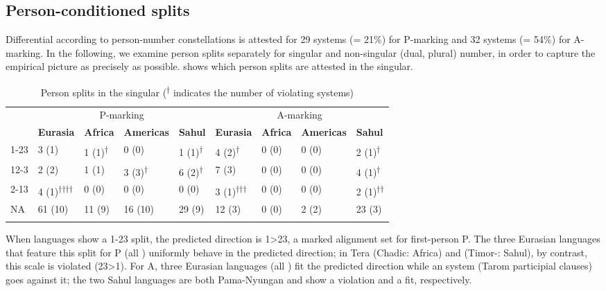 \documentclass[output=paper]{langscibook}
\begin{document}
\subsection{Person-conditioned splits}
\label{18-sc-subsec:2-5}

Differential  according to person-number constellations is attested for 29 systems (= 21\%) for P-marking and 32 systems (= 54\%) for A-marking. In the following, we examine person splits separately for singular and non-singular (dual, plural) number, in order to capture the empirical picture as precisely as possible.  shows which person splits are attested in the singular.

\begin{table}
\caption{Person splits in the singular (\textsuperscript{†} indicates the number of violating systems)}
\label{18-sc-tab:8}
{\small 
\begin{tabularx}{\textwidth}{l  llll llll}
\lsptoprule
& \multicolumn{4}{c}{P-marking} & \multicolumn{4}{c}{A-marking}\\

& \bfseries Eurasia & \bfseries Africa & \bfseries Americas & \bfseries Sahul   & \bfseries Eurasia & \bfseries Africa & \bfseries Americas & \bfseries Sahul\\
\midrule
1-23 & 3 (1) & 1 (1)\textsuperscript{†} & 0 (0) & 1 (1)\textsuperscript{†} & 4  (2)\textsuperscript{†} & 0 (0) & 0 (0) & 2 (1)\textsuperscript{†}\\
12-3 & 2  (2)& 1 (1) & 3 (3)\textsuperscript{†} & 6  (2)\textsuperscript{†}  & 7 (3) & 0 (0) & 0 (0) & 4 (1)\textsuperscript{†}\\
2-13 & 4 (1)\textsuperscript{††††} & 0 (0) & 0 (0) & 0 (0)  & 3 (1)\textsuperscript{†††} & 0 (0) & 0 (0) & 2 (1)\textsuperscript{††}\\
NA & 61 (10) & 11 (9) & 16 (10) & 29 (9)  & 12 (3) & 0 (0) & 2  (2) & 23 (3)\\
\lspbottomrule
\end{tabularx}}
\end{table}

When languages show a 1-23 split, the predicted direction is 1>23, \eg a marked alignment set for first-person P. The three Eurasian languages that feature this split for P (all ) uniformly behave in the predicted direction; in Tera (Chadic: Africa) and  (Timor-: Sahul), by contrast, this scale is violated (23>1). For A, three Eurasian languages (all ) fit the predicted direction while an  system (Tarom participial clauses) goes against it; the two Sahul languages are both Pama-Nyungan and show a violation and a fit, respectively.
\end{document}
